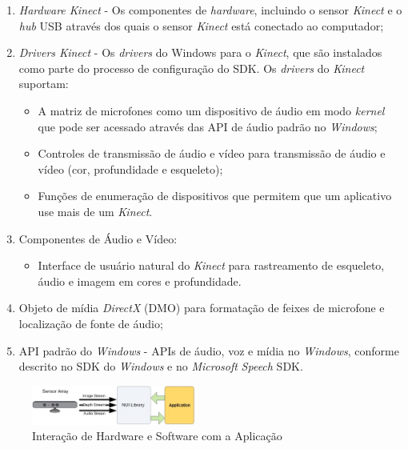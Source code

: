 \begin{enumerate}
    \item \textit{Hardware Kinect} - Os componentes de \textit{hardware}, incluindo o sensor \textit{Kinect} e o \textit{hub} USB através dos quais o sensor \textit{Kinect} está conectado ao computador;
    \item \textit{Drivers Kinect} - Os \textit{drivers} do Windows para o \textit{Kinect}, que são instalados como parte do processo de configuração do SDK. Os \textit{drivers} do \textit{Kinect} suportam:
        \begin{itemize}
            \item A matriz de microfones como um dispositivo de áudio em modo \textit{kernel} que pode ser acessado  através das API de áudio padrão no \textit{Windows}; 
            \item Controles de transmissão de áudio e vídeo para transmissão de áudio e vídeo (cor, profundidade e esqueleto);
            \item Funções de enumeração de dispositivos que permitem que um aplicativo use mais de um \textit{Kinect}.	
        \end{itemize} 
    \item Componentes de Áudio e Vídeo:
        \begin{itemize}
            \item Interface de usuário natural do \textit{Kinect} para rastreamento de esqueleto, áudio e imagem em cores e profundidade. 
        \end{itemize}
    \item Objeto de mídia \textit{DirectX} (DMO) para formatação de feixes de microfone e localização de fonte de áudio;
    \item API padrão do \textit{Windows} - APIs de áudio, voz e mídia no \textit{Windows}, conforme descrito no SDK do \textit{Windows} e no \textit{Microsoft} \textit{Speech} SDK.
\end{enumerate}

\begin{figure}[ht]
\centering
\includegraphics[width=0.48\textwidth]{images/sdk_interaction.png}
\caption{Interação de Hardware e Software com a Aplicação}
\label{fig:sdk_interact}
\end{figure}

